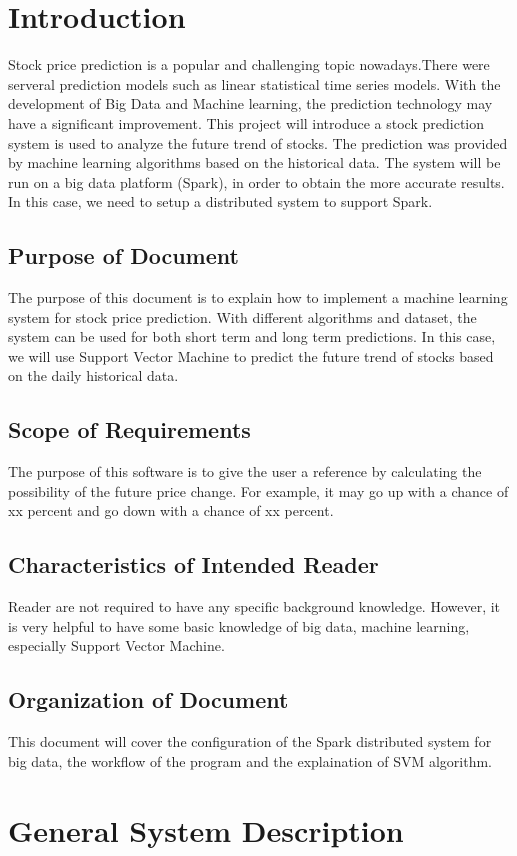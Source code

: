 \documentclass[12pt]{article}
\begin{document}
\section{Introduction}
Stock price prediction is a popular and challenging topic nowadays.There were serveral prediction models such as linear statistical time series models. With the development of Big Data and Machine learning, the prediction technology may have a significant improvement. 
This project will introduce a stock prediction system is used to analyze the future trend of stocks. The prediction was provided by machine learning algorithms based on the historical data. 
The system will be run on a big data platform (Spark), in order to obtain the more accurate results. In this case, we need to setup a distributed system to support Spark.

\subsection{Purpose of Document}
The purpose of this document is to explain how to implement a machine learning system for stock price prediction.   With different algorithms and dataset, the system can be used for both short term and long term predictions.
In this case, we will use Support Vector Machine to predict the future trend of stocks based on the daily historical data. 
\subsection{Scope of Requirements} 
The purpose of this software is to give the user a reference by calculating the possibility of the future price change. For example, it may go up with a chance of xx percent and go down with a chance of xx percent. 
\subsection{Characteristics of Intended Reader} 
Reader are not required to have any specific  background knowledge. However, it is very helpful to have some basic knowledge of big data, machine learning, especially Support Vector Machine.
\subsection{Organization of Document}
This document will cover the configuration of the Spark distributed system for big data, the workflow of the program and the explaination of SVM algorithm.
\section{General System Description}
\end{document}
